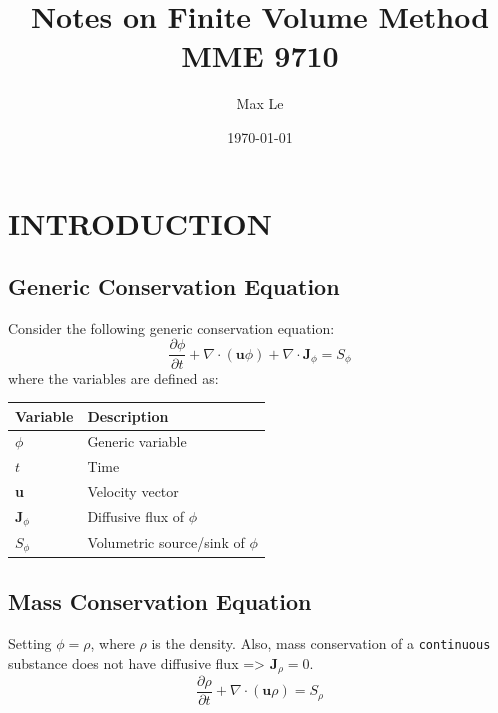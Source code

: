 \documentclass[11pt]{article}
\author{Max Le}
\date{\today}
\title{Notes on Finite Volume Method MME 9710}
\begin{document}
\maketitle
\tableofcontents




\lstset{style=mystyle}



\section{INTRODUCTION}
\label{sec:org9db87da}
\subsection{Generic Conservation Equation}
\label{sec:org3d7bcdb}
Consider the following generic conservation equation:
\begin{equation}
\frac{\partial \phi}{\partial t} + \nabla \cdot (\textbf{u}\phi) + \nabla \cdot \textbf{J}_\phi = S_\phi
\end{equation}
where the variables are defined as:


\begin{center}
\begin{tabular}{ll}
\textbf{Variable} & \textbf{Description}\\
\hline
\(\phi\) & Generic variable\\
\(t\) & Time\\
\textbf{u} & Velocity vector\\
\(\textbf{J}_\phi\) & Diffusive flux of \(\phi\)\\
\(S_\phi\) & Volumetric source/sink of \(\phi\)\\
\hline
\end{tabular}
\end{center}

\subsection{Mass Conservation Equation}
\label{sec:org7304a03}
Setting \(\phi = \rho\), where \(\rho\) is the density. Also, mass conservation of a \texttt{continuous} substance does not
have diffusive flux => \(\textbf{J}_\rho = 0\).
\begin{equation}
\frac{\partial \rho}{\partial t} + \nabla \cdot (\textbf{u}\rho) = S_\rho
\end{equation}
\end{document}
